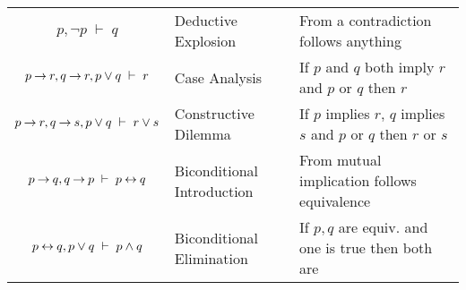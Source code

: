 \begin{tabular}{c l l}
  $p, \neg p \;\vdash\; q$                                     & 
  Deductive Explosion                                           & 
  From a contradiction follows anything                         \\   
  
  $p \mathbin{\rightarrow} r, q \mathbin{\rightarrow} r, p \vee q \;\vdash\; r$                & 
  Case Analysis                                                 & 
  If $p$ and $q$ both imply $r$ and $p$ or $q$ then $r$         \\ 
  
  $p \mathbin{\rightarrow} r, q \mathbin{\rightarrow} s, p \vee q \;\vdash\; r \vee s$         & 
  Constructive Dilemma                                          & 
  If $p$ implies $r$, $q$ implies $s$ and $p$ or $q$ then $r$ or $s$         \\ 
  
  $p \mathbin{\rightarrow} q, q \mathbin{\rightarrow} p \;\vdash\; p \mathbin{\leftrightarrow} q$                & 
  Biconditional Introduction                                    & 
  From mutual implication follows equivalence                   \\   
  
  $p \mathbin{\leftrightarrow} q, p \vee q \;\vdash\; p \wedge q$                & 
  Biconditional Elimination                                     & 
  If $p,q$ are equiv. and one is true then both are         \\     
  
\end{tabular}
\medskip
















